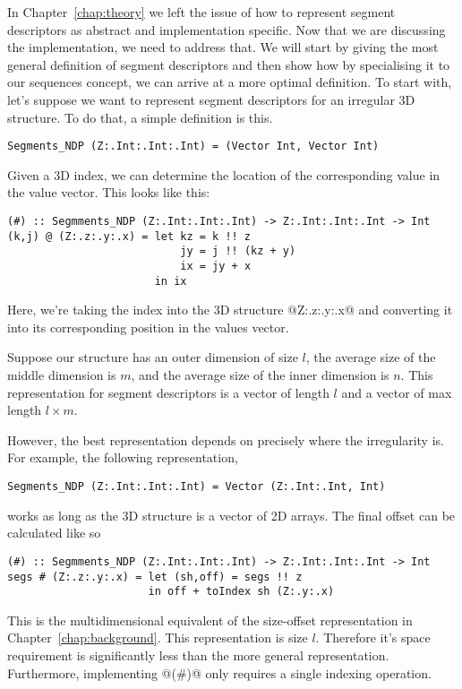 In Chapter~\ref{chap:theory} we left the issue of how to represent segment descriptors as abstract and implementation specific. Now that we are discussing the implementation, we need to address that. We will start by giving the most general definition of segment descriptors and then show how by specialising it to our sequences concept, we can arrive at a more optimal definition. To start with, let's suppose we want to represent segment descriptors for an irregular 3D structure. To do that, a simple definition is this.
%
\begin{lstlisting}[style=ndp]
Segments_NDP (Z:.Int:.Int:.Int) = (Vector Int, Vector Int)
\end{lstlisting}
%
Given a 3D index, we can determine the location of the corresponding value in the value vector. This looks like this:
%
\begin{lstlisting}[style=ndp]
(#) :: Segmments_NDP (Z:.Int:.Int:.Int) -> Z:.Int:.Int:.Int -> Int
(k,j) @ (Z:.z:.y:.x) = let kz = k !! z
                           jy = j !! (kz + y)
                           ix = jy + x
                       in ix
\end{lstlisting}
%
Here, we're taking the index into the 3D structure @Z:.z:.y:.x@ and converting it into its corresponding position in the values vector.

Suppose our structure has an outer dimension of size $l$, the average size of the middle dimension is $m$, and the average size of the inner dimension is $n$. This representation for segment descriptors is a vector of length $l$ and a vector of max length $l \times m$.

However, the best representation depends on precisely where the irregularity is. For example, the following representation,
%
\begin{lstlisting}[style=ndp]
Segments_NDP (Z:.Int:.Int:.Int) = Vector (Z:.Int:.Int, Int)
\end{lstlisting}
%
works as long as the 3D structure is a vector of 2D arrays. The final offset can be calculated like so
%
\begin{lstlisting}[style=ndp]
(#) :: Segmments_NDP (Z:.Int:.Int:.Int) -> Z:.Int:.Int:.Int -> Int
segs # (Z:.z:.y:.x) = let (sh,off) = segs !! z
                      in off + toIndex sh (Z:.y:.x)
\end{lstlisting}
%
This is the multidimensional equivalent of the size-offset representation in Chapter~\ref{chap:background}. This representation is size $l$. Therefore it's space requirement is significantly less than the more general representation. Furthermore, implementing @(#)@ only requires a single indexing operation.

